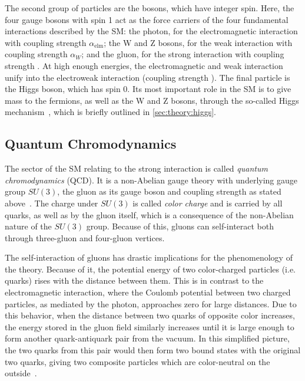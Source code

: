 The second group of particles are the bosons, which have integer spin. Here, the four gauge bosons with spin 1 act as the force carriers of the four fundamental interactions described by the SM: the photon, for the electromagnetic interaction with coupling strength $\alpha_{\mathrm{elm}}$; the W and Z bosons, for the weak interaction with coupling strength $\alpha_W$; and the gluon, for the strong interaction with coupling strength \alphas. At high enough energies, the electromagnetic and weak interaction unify into the electroweak interaction (coupling strength \alphaew). The final particle is the Higgs boson, which has spin 0. Its most important role in the SM is to give mass to the fermions, as well as the W and Z bosons, through the so-called Higgs mechanism~\cite{Higgs:1964ia,Englert:1964et}, which is briefly outlined in \cref{sec:theory:higgs}.

\subsection{Quantum Chromodynamics}
\label{sec:theory:qcd}

The sector of the SM relating to the strong interaction is called \textit{quantum chromodynamics} (QCD). It is a non-Abelian gauge theory with underlying gauge group $SU(3)$, the gluon as its gauge boson and coupling strength \alphas as stated above~\cite{Schwartz:2014sze,Peskin:1995ev}. The charge under $SU(3)$ is called \textit{color charge} and is carried by all quarks, as well as by the gluon itself, which is a consequence of the non-Abelian nature of the $SU(3)$ group. Because of this, gluons can self-interact both through three-gluon and four-gluon vertices.

The self-interaction of gluons has drastic implications for the phenomenology of the theory. Because of it, the potential energy of two color-charged particles (i.e. quarks) rises with the distance between them. This is in contrast to the electromagnetic interaction, where the Coulomb potential between two charged particles, as mediated by the photon, approaches zero for large distances. Due to this behavior, when the distance between two quarks of opposite color increases, the energy stored in the gluon field similarly increases until it is large enough to form another quark-antiquark pair from the vacuum. In this simplified picture, the two quarks from this pair would then form two bound states with the original two quarks, giving two composite particles which are color-neutral on the outside~\cite{Schwartz:2014sze}.

